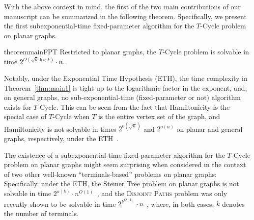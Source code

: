 \documentclass{article}
\numberwithin{claimcounter}{lemma}
\newcommand{\dispaths}{\textsc{Disjoint Paths}\xspace}
\begin{document}
With the above context in mind, the first of the two  main contributions of our manuscript can be summarized in the following theorem. Specifically, we present the first subexponential-time fixed-parameter algorithm for the {\sc $T$-Cycle} problem on planar graphs.



\begin{restatable}{theorem}{mainFPT}\label{thm:main1}
Restricted to planar graphs, the {\sc $T$-Cycle} problem is solvable in time $2^{O(\sqrt{k}\log k)}\cdot n$.
\end{restatable}




Notably, under the Exponential Time Hypothesis (ETH), the time complexity in Theorem~\ref{thm:main1} is tight up to the logarithmic factor in the exponent, and, on general graphs, no sub-exponential-time (fixed-parameter or not) algorithm exists for {\sc $T$-Cycle}. This can be seen from the fact that {\sc Hamiltonicity} is the special case of {\sc $T$-Cycle} when $T$ is the entire vertex set of the graph, and {\sc Hamiltonicity} is not solvable in times $2^{o(\sqrt{n})}$ and $2^{o(n)}$ on planar and general graphs, respectively, under the ETH~\cite{DBLP:books/sp/CyganFKLMPPS15}.

The existence of a subexponential-time fixed-parameter algorithm for the {\sc $T$-Cycle} problem on planar graphs might seem surprising when considered in the context of two other well-known ``terminals-based'' problems on planar graphs: Specifically, under the ETH, the {\sc Steiner Tree} problem on planar graphs is not solvable in time $2^{o(k)}\cdot n^{O(1)}$~\cite{DBLP:conf/focs/MarxPP18}, and the \dispaths problem was only recently shown to be solvable in time $2^{k^{O(1)}}\cdot n$~\cite{cho2023parameterized}, where, in both cases, $k$ denotes the number of terminals.
\end{document}
